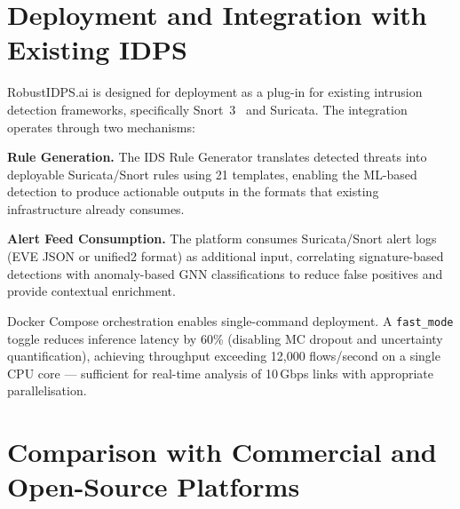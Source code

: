 \section{Deployment and Integration with Existing IDPS}
\label{sec:deployment}

RobustIDPS.ai is designed for deployment as a plug-in for existing intrusion detection frameworks, specifically Snort~3~\cite{Roesch1999} and Suricata. The integration operates through two mechanisms:

\noindent\textbf{Rule Generation.} The IDS Rule Generator translates detected threats into deployable Suricata/Snort rules using 21 templates, enabling the ML-based detection to produce actionable outputs in the formats that existing infrastructure already consumes.

\noindent\textbf{Alert Feed Consumption.} The platform consumes Suricata/Snort alert logs (EVE JSON or unified2 format) as additional input, correlating signature-based detections with anomaly-based GNN classifications to reduce false positives and provide contextual enrichment.

Docker Compose orchestration enables single-command deployment. A \texttt{fast\_mode} toggle reduces inference latency by 60\% (disabling MC dropout and uncertainty quantification), achieving throughput exceeding 12,000 flows/second on a single CPU core --- sufficient for real-time analysis of 10\,Gbps links with appropriate parallelisation.


\section{Comparison with Commercial and Open-Source Platforms}
\label{sec:platform_comparison}

